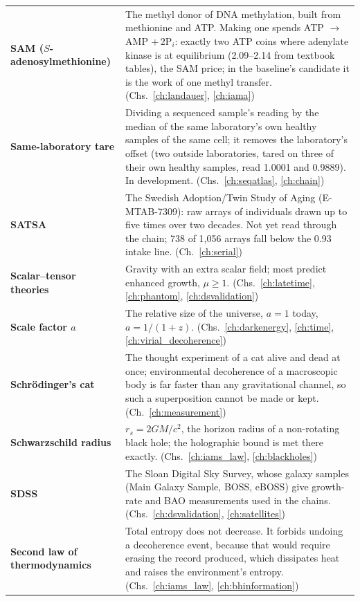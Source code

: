 {\begin{longtable}{@{}>{\raggedright\arraybackslash}p{}>{\raggedright\arraybackslash}p{}@{}}
\textbf{SAM ($S$-adenosylmethionine)} & The methyl donor of DNA methylation, built from methionine and ATP. Making one spends ATP $\to$ AMP $+\,2$P$_i$: exactly two ATP coins where adenylate kinase is at equilibrium (2.09--2.14 from textbook tables), the SAM price; in the baseline's candidate it is the work of one methyl transfer. {\footnotesize(Chs.~\ref{ch:landauer}, \ref{ch:iama})}\\[1pt]
\textbf{Same-laboratory tare} & Dividing a sequenced sample's reading by the median of the same laboratory's own healthy samples of the same cell; it removes the laboratory's offset (two outside laboratories, tared on three of their own healthy samples, read 1.0001 and 0.9889). In development. {\footnotesize(Chs.~\ref{ch:seqatlas}, \ref{ch:chain})}\\[1pt]
\textbf{SATSA} & The Swedish Adoption/Twin Study of Aging (E-MTAB-7309): raw arrays of individuals drawn up to five times over two decades. Not yet read through the chain; 738 of 1,056 arrays fall below the 0.93 intake line. {\footnotesize(Ch.~\ref{ch:serial})}\\[1pt]
\textbf{Scalar--tensor theories} & Gravity with an extra scalar field; most predict enhanced growth, $\mu\ge1$. {\footnotesize(Chs.~\ref{ch:latetime}, \ref{ch:phantom}, \ref{ch:dsvalidation})}\\[1pt]
\textbf{Scale factor $a$} & The relative size of the universe, $a=1$ today, $a=1/(1+z)$. {\footnotesize(Chs.~\ref{ch:darkenergy}, \ref{ch:time}, \ref{ch:virial_decoherence})}\\[1pt]
\textbf{Schr\"odinger's cat} & The thought experiment of a cat alive and dead at once; environmental decoherence of a macroscopic body is far faster than any gravitational channel, so such a superposition cannot be made or kept. {\footnotesize(Ch.~\ref{ch:measurement})}\\[1pt]
\textbf{Schwarzschild radius} & $r_s=2GM/c^2$, the horizon radius of a non-rotating black hole; the holographic bound is met there exactly. {\footnotesize(Chs.~\ref{ch:iams_law}, \ref{ch:blackholes})}\\[1pt]
\textbf{SDSS} & The Sloan Digital Sky Survey, whose galaxy samples (Main Galaxy Sample, BOSS, eBOSS) give growth-rate and BAO measurements used in the chains. {\footnotesize(Chs.~\ref{ch:dsvalidation}, \ref{ch:satellites})}\\[1pt]
\textbf{Second law of thermodynamics} & Total entropy does not decrease. It forbids undoing a decoherence event, because that would require erasing the record produced, which dissipates heat and raises the environment's entropy. {\footnotesize(Chs.~\ref{ch:iams_law}, \ref{ch:bhinformation})}\\[1pt]

\end{longtable}}
